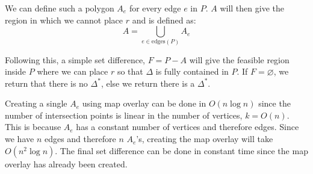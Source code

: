 \documentclass{article}
\begin{document}
  We can define such a polygon $A_e$ for every edge $e$ in $P$. 
  $A$ will then give the region in which we cannot place $r$ and is defined as:
  $$A = \bigcup_{e \in \text{edges}(P)} A_e$$
  
  Following this, a simple set difference, $F = P - A$ will give the feasible region inside $P$ where we can place $r$ so that $\Delta$ is fully contained in $P$.
  If $F = \varnothing$, we return that there is no $\Delta^*$, else we return there is a $\Delta^*$.

  Creating a single $A_e$ using map overlay can be done in $O(n\log n)$ since the number of intersection points is linear in the number of vertices, $k = O(n)$.
  This is because $A_e$ has a constant number of vertices and therefore edges.
  Since we have $n$ edges and therefore $n$ $A_e$'s, creating the map overlay will take $O(n^2\log n)$. The final set difference can be done in constant time since the map overlay has already been created.
\end{document}
